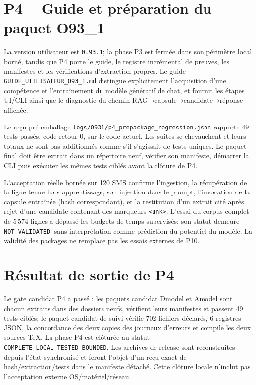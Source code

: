 \documentclass[11pt,a4paper]{article}
\begin{document}
\section{P4 -- Guide et préparation du paquet O93\_1}
La version utilisateur est \texttt{0.93.1}; la phase P3 est fermée dans son périmètre local borné, tandis que P4 porte le guide, le registre incrémental de preuves, les manifestes et les vérifications d'extraction propres. Le guide \texttt{GUIDE\_UTILISATEUR\_O93\_1.md} distingue explicitement l'acquisition d'une compétence et l'entraînement du modèle génératif de chat, et fournit les étapes UI/CLI ainsi que le diagnostic du chemin RAG→capsule→candidate→réponse affichée.

Le reçu pré-emballage \texttt{logs/O931/p4\_prepackage\_regression.json} rapporte 49 tests passés, code retour 0, sur le code actuel. Les suites se chevauchent et leurs totaux ne sont pas additionnés comme s'il s'agissait de tests uniques. Le paquet final doit être extrait dans un répertoire neuf, vérifier son manifeste, démarrer la CLI puis exécuter les mêmes tests ciblés avant la clôture de P4.

L'acceptation réelle bornée sur 120 SMS confirme l'ingestion, la récupération de la ligne tenue hors apprentissage, son injection dans le prompt, l'invocation de la capsule entraînée (hash correspondant), et la restitution d'un extrait cité après rejet d'une candidate contenant des marqueurs \texttt{<unk>}. L'essai du corpus complet de 5\,574 lignes a dépassé les budgets de temps supervisés; son statut demeure \texttt{NOT\_VALIDATED}, sans interprétation comme prédiction du potentiel du modèle. La validité des packages ne remplace pas les essais externes de P10.


\section{Résultat de sortie de P4}
Le gate candidat P4 a passé : les paquets candidat Dmodel et Amodel sont chacun extraits dans des dossiers neufs, vérifient leurs manifestes et passent 49 tests ciblés; le paquet candidat de suivi vérifie 702 fichiers déclarés, 6 registres JSON, la concordance des deux copies des journaux d'erreurs et compile les deux sources TeX. La phase P4 est clôturée au statut \texttt{COMPLETE\_LOCAL\_TESTED\_BOUNDED}. Les archives de release sont reconstruites depuis l'état synchronisé et feront l'objet d'un reçu exact de hash/extraction/tests dans le manifeste détaché. Cette clôture locale n'inclut pas l'acceptation externe OS/matériel/réseau.
\end{document}
